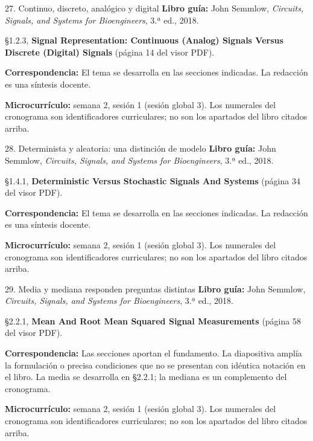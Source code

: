 \documentclass[
  10pt,
  ignorenonframetext,
  aspectratio=169,
  spanish,
]{beamer}
\begin{document}
\begin{frame}{27. Continuo, discreto, analógico y digital}
\label{continuo-discreto-analuxf3gico-y-digital}
\textbf{Libro guía:} John Semmlow, \emph{Circuits, Signals, and Systems
for Bioengineers}, 3.ª ed., 2018.

§1.2.3, \textbf{Signal Representation: Continuous (Analog) Signals
Versus Discrete (Digital) Signals} (página 14 del visor PDF).

\textbf{Correspondencia:} El tema se desarrolla en las secciones
indicadas. La redacción es una síntesis docente.

\textbf{Microcurrículo:} semana 2, sesión 1 (sesión global 3). Los
numerales del cronograma son identificadores curriculares; no son los
apartados del libro citados arriba.
\end{frame}

\begin{frame}{28. Determinista y aleatoria: una distinción de modelo}
\label{determinista-y-aleatoria-una-distinciuxf3n-de-modelo}
\textbf{Libro guía:} John Semmlow, \emph{Circuits, Signals, and Systems
for Bioengineers}, 3.ª ed., 2018.

§1.4.1, \textbf{Deterministic Versus Stochastic Signals And Systems}
(página 34 del visor PDF).

\textbf{Correspondencia:} El tema se desarrolla en las secciones
indicadas. La redacción es una síntesis docente.

\textbf{Microcurrículo:} semana 2, sesión 1 (sesión global 3). Los
numerales del cronograma son identificadores curriculares; no son los
apartados del libro citados arriba.
\end{frame}

\begin{frame}{29. Media y mediana responden preguntas distintas}
\label{media-y-mediana-responden-preguntas-distintas}
\textbf{Libro guía:} John Semmlow, \emph{Circuits, Signals, and Systems
for Bioengineers}, 3.ª ed., 2018.

§2.2.1, \textbf{Mean And Root Mean Squared Signal Measurements} (página
58 del visor PDF).

\textbf{Correspondencia:} Las secciones aportan el fundamento. La
diapositiva amplía la formulación o precisa condiciones que no se
presentan con idéntica notación en el libro. La media se desarrolla en
§2.2.1; la mediana es un complemento del cronograma.

\textbf{Microcurrículo:} semana 2, sesión 1 (sesión global 3). Los
numerales del cronograma son identificadores curriculares; no son los
apartados del libro citados arriba.
\end{frame}
\end{document}
